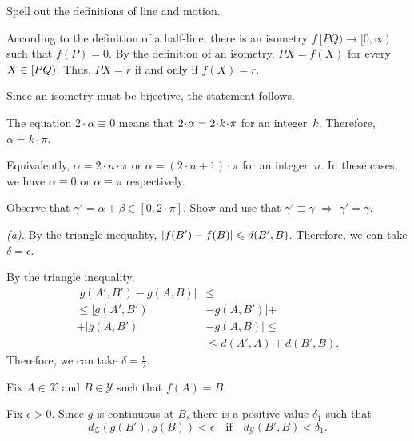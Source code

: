 Spell out the definitions of line and motion.

According to the definition of a half-line,
there is an isometry
$f\:[P Q)\to [0,\infty)$
such that $f(P)=0$.
By the definition of an isometry, $P X=f(X)$ for every $X\z\in [P Q)$.
Thus, $P X=r$ if and only if $f(X)=r$.

Since an isometry must be bijective, the statement follows.




The equation
$2\cdot\alpha\equiv 0$
means that $2\cdot\alpha\z=2\cdot k\cdot\pi$ for an integer~$k$.
Therefore,
$\alpha=k\cdot\pi$.

Equivalently, $\alpha=2\cdot n\cdot \pi$ or $\alpha=(2\cdot n+1)\cdot \pi$ for an integer~$n$.
In these cases, we have $\alpha\equiv 0$ or $\alpha\equiv \pi$ respectively.

Observe that $\gamma'=\alpha+\beta\in [0,2\cdot \pi]$.
Show and use that $\gamma'\equiv\gamma$ $\Rightarrow$ $\gamma'=\gamma$.

 \textit{(a).}
By the triangle inequality,
$|f(B')\z-f(B)|\le d(B',B)$.
Therefore, we can take $\delta=\epsilon$.

By the triangle inequality,
\begin{align*}
|g(A',B')-g(A,B)|
&\le
\\
\le|g(A',B')&-g(A,B')|+
\\
+
|g(A,B')&-g(A,B)|\le
\\
&\le d(A',A)+d(B',B).
\end{align*}
Therefore, we can take $\delta=\tfrac\epsilon2$.

Fix $A\in \mathcal{X}$ and $B\in\mathcal{Y}$
such that $f(A)=B$.

Fix $\epsilon>0$.
Since $g$ is continuous at $B$, there is a positive value $\delta_1$ such that 
$$d_{\mathcal{Z}}(g(B'),g(B))<\epsilon
\quad
\text{if}
\quad
d_{\mathcal{Y}}(B',B)<\delta_1.$$ 

